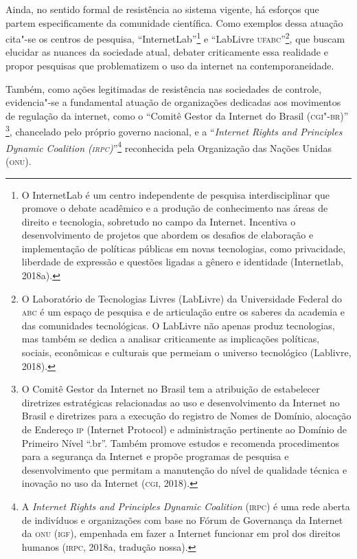 Ainda, no sentido formal de resistência ao sistema vigente, há esforços
que partem especificamente da comunidade científica. Como exemplos dessa
atuação cita"-se os centros de pesquisa, ``InternetLab''\footnote{O
  InternetLab é um centro independente de pesquisa interdisciplinar que
  promove o debate acadêmico e a produção de conhecimento nas áreas de
  direito e tecnologia, sobretudo no campo da Internet. Incentiva o
  desenvolvimento de projetos que abordem os desafios de elaboração e
  implementação de políticas públicas em novas tecnologias, como
  privacidade, liberdade de expressão e questões ligadas a gênero e
  identidade (Internetlab, 2018a).} e ``LabLivre \textsc{ufabc}''\footnote{O
  Laboratório de Tecnologias Livres (LabLivre) da Universidade Federal
  do \textsc{abc} é um espaço de pesquisa e de articulação entre os saberes da
  academia e das comunidades tecnológicas. O LabLivre não apenas produz
  tecnologias, mas também se dedica a analisar criticamente as
  implicações políticas, sociais, econômicas e culturais que permeiam o
  universo tecnológico (Lablivre, 2018).}, que buscam elucidar as
nuances da sociedade atual, debater criticamente essa realidade e propor
pesquisas que problematizem o uso da internet na contemporaneidade.

Também, como ações legitimadas de resistência nas sociedades de
controle, evidencia"-se a fundamental atuação de organizações dedicadas
aos movimentos de regulação da internet, como o ``Comitê Gestor da
Internet do Brasil (\textsc{cgi"-br})'' \footnote{O Comitê Gestor da Internet no
  Brasil tem a atribuição de estabelecer diretrizes estratégicas
  relacionadas ao uso e desenvolvimento da Internet no Brasil e
  diretrizes para a execução do registro de Nomes de Domínio, alocação
  de Endereço \textsc{ip} (Internet Protocol) e administração pertinente ao
  Domínio de Primeiro Nível ``.br''. Também promove estudos e recomenda
  procedimentos para a segurança da Internet e propõe programas de
  pesquisa e desenvolvimento que permitam a manutenção do nível de
  qualidade técnica e inovação no uso da Internet (\textsc{cgi}, 2018).},
chancelado pelo próprio governo nacional, e a ``\emph{Internet Rights
and Principles Dynamic Coalition (\textsc{irpc})}''\footnote{A \emph{Internet
  Rights and Principles Dynamic Coalition} (\textsc{irpc}) é uma rede aberta de
  indivíduos e organizações com base no Fórum de Governança da Internet
  da \textsc{onu} (\textsc{igf}), empenhada em fazer a Internet funcionar em prol dos
  direitos humanos (\textsc{irpc}, 2018a, tradução nossa).} reconhecida pela Organização das Nações Unidas (\textsc{onu}).

